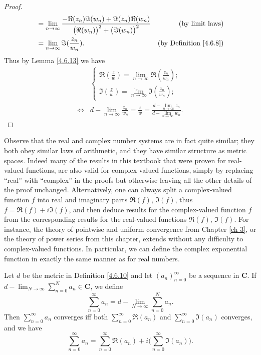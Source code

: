 \begin{proof}
\begin{align*}
                         & = \lim_{n \to \infty} \frac{- \Re(z_n) \Im(w_n) + \Im(z_n) \Re(w_n)}{\big(\Re(w_n)\big)^2 + \big(\Im(w_n)\big)^2} & \text{(by limit laws)}             \\
                         & = \lim_{n \to \infty} \Im(\frac{z_n}{w_n}).                                                                       & \text{(by Definition \ref{4.6.8})}
    \end{align*}
    Thus by Lemma \ref{4.6.13} we have
    \begin{align*}
             & \begin{cases}
                   \Re(\frac{z}{w}) = \lim_{n \to \infty} \Re(\frac{z_n}{w_n}); \\
                   \Im(\frac{z}{w}) = \lim_{n \to \infty} \Im(\frac{z_n}{w_n});
               \end{cases}                                                             \\
        \iff & d - \lim_{n \to \infty} \frac{z_n}{w_n} = \frac{z}{w} = \frac{d - \lim_{n \to \infty} z_n}{d - \lim_{n \to \infty} w_n}.
    \end{align*}
\end{proof}

\begin{note}
    Observe that the real and complex number systems are in fact quite similar;
    they both obey similar laws of arithmetic, and they have similar structure as metric spaces.
    Indeed many of the results in this textbook that were proven for real-valued functions, are also valid for complex-valued functions, simply by replacing ``real'' with ``complex'' in the proofs but otherwise leaving all the other details of the proof unchanged.
    Alternatively, one can always split a complex-valued function \(f\) into real and imaginary parts \(\Re(f)\), \(\Im(f)\), thus \(f = \Re(f) + i \Im(f)\), and then deduce results for the complex-valued function \(f\) from the corresponding results for the real-valued functions \(\Re(f)\), \(\Im(f)\).
    For instance, the theory of pointwise and uniform convergence from Chapter \ref{ch 3}, or the theory of power series from this chapter, extends without any difficulty to complex-valued functions.
    In particular, we can define the complex exponential function in exactly the same manner as for real numbers.
\end{note}

\begin{additional corollary}\label{ac 4.6.6}
Let \(d\) be the metric in Definition \ref{4.6.10} and let \((a_n)_{n = 0}^\infty\) be a sequence in \(\mathbf{C}\).
If \(d - \lim_{N \to \infty} \sum_{n = 0}^N a_n \in \mathbf{C}\), we define
\[
    \sum_{n = 0}^\infty a_n = d - \lim_{N \to \infty} \sum_{n = 0}^N a_n.
\]
Then \(\sum_{n = 0}^\infty a_n\) converges iff both \(\sum_{n = 0}^\infty \Re(a_n)\) and \(\sum_{n = 0}^\infty \Im(a_n)\) converges, and we have
\[
    \sum_{n = 0}^\infty a_n = \sum_{n = 0}^\infty \Re(a_n) + i \bigg(\sum_{n = 0}^\infty \Im(a_n)\bigg).
\]
\end{additional corollary}

